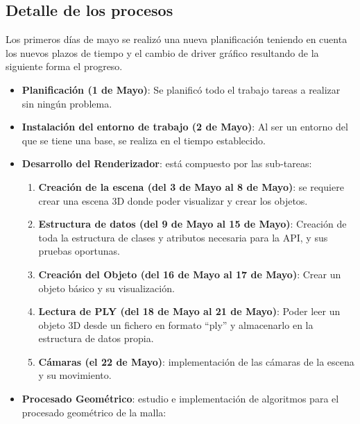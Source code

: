 \subsection{ Detalle de los procesos}

Los primeros días de mayo se realizó una nueva planificación teniendo en cuenta los nuevos plazos de tiempo y el cambio de driver gráfico resultando de la siguiente forma el progreso.\\

\begin{itemize}
	\item[] \textbf{Planificación (1 de Mayo)}: Se planificó todo el trabajo tareas a realizar sin ningún problema.
	
	\item[] \textbf{Instalación del entorno de trabajo (2 de Mayo)}: Al ser un entorno del que se tiene una base, se realiza en el tiempo establecido.
	
	\item[] \textbf{Desarrollo del Renderizador}: está compuesto por las sub-tareas:
	\begin{enumerate}
		\item \textbf{Creación de la escena (del 3 de Mayo al 8 de Mayo)}: se requiere crear una escena 3D donde poder visualizar y crear los objetos.
		
		\item \textbf{Estructura de datos (del 9 de Mayo al 15 de Mayo)}: Creación de toda la estructura de clases y atributos necesaria para la API, y sus pruebas oportunas.
		
		\item \textbf{Creación del Objeto (del 16 de Mayo al 17 de Mayo)}: Crear un objeto básico y su visualización.
		
		\item \textbf{Lectura de PLY (del 18 de Mayo al 21 de Mayo)}: Poder leer un objeto 3D desde un fichero en formato ``ply'' y almacenarlo en la estructura de datos propia.
		
		\item \textbf{Cámaras (el 22 de Mayo)}: implementación de las cámaras de la escena y su movimiento.
		
	\end{enumerate}
	
	\item[] \textbf{Procesado Geométrico}: estudio e implementación de algoritmos para el procesado geométrico de la malla:
	\begin{enumerate}
		

\end{enumerate}
\end{itemize}
